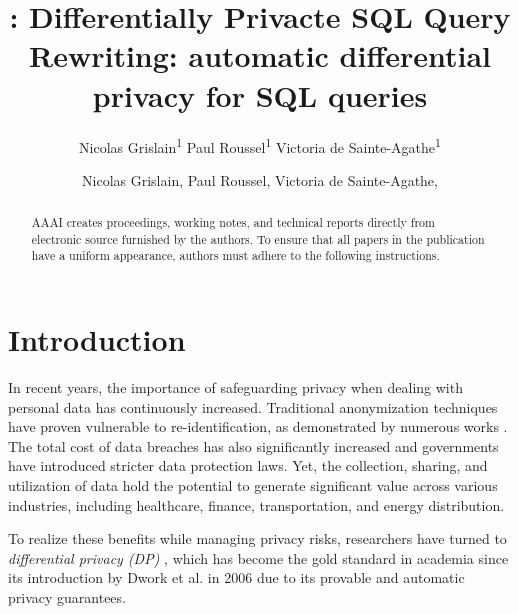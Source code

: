 \documentclass[letterpaper]{article} %
\title{\qrlew: Differentially Privacte SQL Query Rewriting}
\author{
    Nicolas Grislain\textsuperscript{\rm 1}
    Paul Roussel\textsuperscript{\rm 1}
    Victoria de Sainte-Agathe\textsuperscript{\rm 1}
}
\title{\qrlew: automatic differential privacy for SQL queries}
\author {
    Nicolas Grislain,
    Paul Roussel,
    Victoria de Sainte-Agathe,
}
\begin{document}
\maketitle

\begin{abstract}
AAAI creates proceedings, working notes, and technical reports directly from electronic source furnished by the authors. To ensure that all papers in the publication have a uniform appearance, authors must adhere to the following instructions.
\end{abstract}

\section{Introduction}

In recent years, the importance of safeguarding privacy when dealing with personal data has continuously increased.
Traditional anonymization techniques have proven vulnerable to re-identification, as demonstrated by numerous works \cite{archie2018s, dwork2017exposed, narayanan2008robust, sweeney2013identifying}.
The total cost of data breaches has also significantly increased \cite{ibm2023cost} and governments have introduced stricter data protection laws.
Yet, the collection, sharing, and utilization of data hold the potential to generate significant value across various industries, including healthcare, finance, transportation, and energy distribution.

To realize these benefits while managing privacy risks, researchers have turned to \emph{differential privacy (DP)} \cite{wood2018differential, dwork2014algorithmic}, which has become the gold standard in academia since its introduction by Dwork et al. in 2006 \cite{dwork2006calibrating} due to its provable and automatic privacy guarantees.
\end{document}
